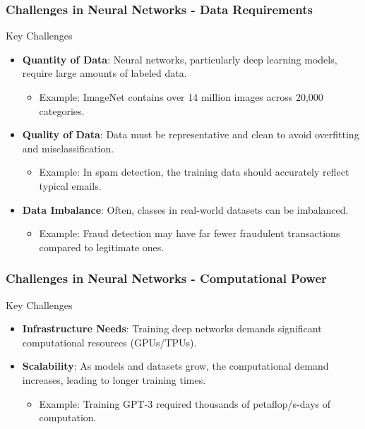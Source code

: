 \documentclass[aspectratio=169]{beamer}
\begin{document}
\begin{frame}[fragile]
    \frametitle{Challenges in Neural Networks - Data Requirements}
    \begin{block}{Key Challenges}
        \begin{itemize}
            \item \textbf{Quantity of Data}:
            Neural networks, particularly deep learning models, require large amounts of labeled data.
            \begin{itemize}
                \item Example: ImageNet contains over 14 million images across 20,000 categories.
            \end{itemize}
            
            \item \textbf{Quality of Data}:
            Data must be representative and clean to avoid overfitting and misclassification.
            \begin{itemize}
                \item Example: In spam detection, the training data should accurately reflect typical emails.
            \end{itemize}
            
            \item \textbf{Data Imbalance}:
            Often, classes in real-world datasets can be imbalanced.
            \begin{itemize}
                \item Example: Fraud detection may have far fewer fraudulent transactions compared to legitimate ones.
            \end{itemize}
        \end{itemize}
    \end{block}
\end{frame}

\begin{frame}[fragile]
    \frametitle{Challenges in Neural Networks - Computational Power}
    \begin{block}{Key Challenges}
        \begin{itemize}
            \item \textbf{Infrastructure Needs}:
            Training deep networks demands significant computational resources (GPUs/TPUs).
            
            \item \textbf{Scalability}:
            As models and datasets grow, the computational demand increases, leading to longer training times.
            \begin{itemize}
                \item Example: Training GPT-3 required thousands of petaflop/s-days of computation.
            \end{itemize}
        \end{itemize}
    \end{block}
\end{frame}
\end{document}
